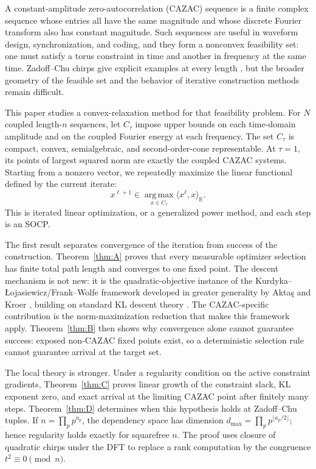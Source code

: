 \documentclass[11pt]{article}
\theoremstyle{plain}
\theoremstyle{definition}
\theoremstyle{remark}
\newcommand{\R}{\mathbb R}
\begin{document}
A constant-amplitude zero-autocorrelation (CAZAC) sequence is a finite complex
sequence whose entries all have the same magnitude and whose discrete Fourier
transform also has constant magnitude.  Such sequences are useful in waveform
design, synchronization, and coding, and they form a nonconvex
feasibility set: one must satisfy a torus constraint in time and another in
frequency at the same time.  Zadoff--Chu chirps give explicit examples at
every length \cite{Chu72}, but the broader geometry of the feasible set and
the behavior of iterative construction methods remain difficult.

This paper studies a convex-relaxation method for that feasibility problem.
For $N$ coupled length-$n$ sequences, let $C_\tau$ impose upper bounds on
each time-domain amplitude and on the coupled Fourier energy at each
frequency.  The set $C_\tau$ is compact, convex, semialgebraic, and
second-order-cone representable.  At $\tau=1$, its points of largest squared
norm are exactly the coupled CAZAC systems.  Starting from a nonzero vector,
we repeatedly maximize the linear functional defined by the current iterate:
\[
 x^{\ell+1}\in\operatorname*{arg\,max}_{x\in C_\tau}
       \langle x^\ell,x\rangle_\R.
\]
This is iterated linear optimization, or a generalized power method, and each
step is an SOCP.

The first result separates convergence of the iteration from success of the
construction.  Theorem~\ref{thm:A} proves that every measurable optimizer
selection has finite total path length and converges to one fixed point.  The
descent mechanism is not new: it is the quadratic-objective instance of the
Kurdyka--{\L}ojasiewicz/Frank--Wolfe framework developed in greater generality
by Akta\c{s} and Kroer \cite{AK25}, building on standard KL descent theory
\cite{ABS13}.  The CAZAC-specific contribution is the norm-maximization
reduction that makes this framework apply.  Theorem~\ref{thm:B} then shows why
convergence alone cannot guarantee success: exposed non-CAZAC fixed
points exist, so a deterministic selection rule cannot guarantee arrival at
the target set.

The local theory is stronger.  Under a regularity condition on the active
constraint gradients, Theorem~\ref{thm:C} proves linear growth of the
constraint slack, KL exponent zero, and exact arrival at the limiting CAZAC
point after finitely many steps.  Theorem~\ref{thm:D} determines when this
hypothesis holds at Zadoff--Chu tuples.  If
$n=\prod_p p^{a_p}$, the dependency space has dimension
$d_{\max}=\prod_p p^{\lfloor a_p/2\rfloor}$; hence regularity holds exactly
for squarefree $n$.  The proof uses closure of quadratic chirps under the
DFT to replace a rank computation by the congruence $t^2\equiv0\pmod n$.
\end{document}
